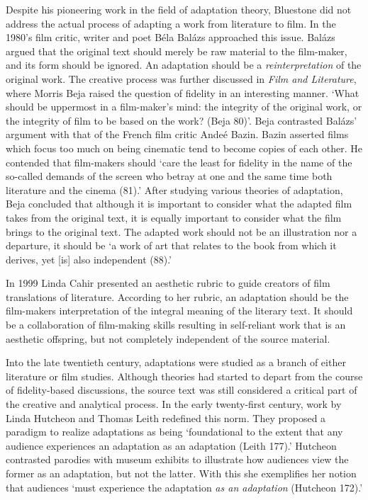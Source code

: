 \documentclass[12pt]{article}
\begin{document}
Despite his pioneering work in the field of adaptation theory, Bluestone did not
address the actual process of adapting a work from literature to film. In the
1980's film critic, writer and poet B\'{e}la Bal\'{a}zs approached this issue.
Bal\'{a}zs argued that the original text should merely be raw material to the
film-maker, and its form should be ignored. An adaptation should be a
\textit{reinterpretation} of the original work. The creative process was further discussed in \textit{Film and Literature},
where Morris Beja raised the question of fidelity in an interesting manner. `What
should be uppermost in a film-maker's mind: the integrity of the original work,
or the integrity of film to be based on the work? (Beja 80)'. Beja contrasted Bal\'{a}zs'
argument with that of the French film critic Ande\'{e} Bazin. Bazin asserted
films which focus too much on being cinematic tend to become
copies of each other. He contended that film-makers should `care the least for
fidelity in the name of the so-called demands of the screen who betray at one
and the same time both literature and the cinema (81).' After studying various theories
of adaptation, Beja concluded that although it is important to
consider what the adapted film takes from the original text, it is equally
important to consider what the film brings to the original text. The adapted
work should not be an illustration nor a departure, it should be `a work of art
that relates to the book from which it derives, yet [is] also independent (88).' 

In 1999 Linda Cahir presented an aesthetic rubric to guide creators of
film translations of literature. According to
her rubric, an adaptation should be the film-makers interpretation of the integral 
meaning of the literary text. It should be a collaboration of film-making skills
resulting in self-reliant work that is an aesthetic offspring, but not completely
independent of the source material.

Into the late twentieth century, adaptations were studied as a branch of
either literature or film studies. Although theories had started to depart from the
course of fidelity-based discussions, the source text was still considered a critical part
of the creative and analytical process. In the early twenty-first century,
work by Linda Hutcheon and Thomas Leith redefined this norm. 
They proposed a paradigm to realize adaptations as being `foundational to the 
extent that any audience experiences an adaptation as an adaptation (Leith 177).' Hutcheon
contrasted parodies with museum exhibits to illustrate how
audiences view the former as an adaptation, but not the latter. With this she
exemplifies her notion that audiences `must experience the 
adaptation \textit{as an adaptation} (Hutcheon 172).'
\end{document}
